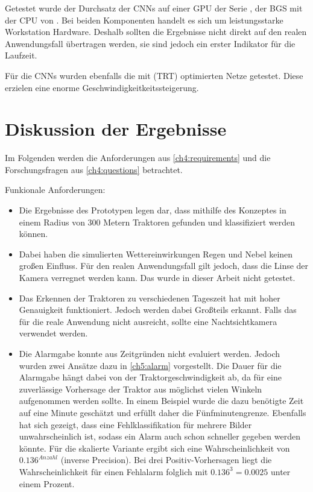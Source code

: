 Getestet wurde der Durchsatz der \acp{CNN} auf einer GPU der Serie , der \ac{BGS} mit der CPU  von .
Bei beiden Komponenten handelt es sich um leistungsstarke Workstation Hardware.
Deshalb sollten die Ergebnisse nicht direkt auf den realen Anwendungsfall übertragen werden, sie sind jedoch ein erster Indikator für die Laufzeit.

Für die \acp{CNN} wurden ebenfalls die mit  (TRT) optimierten Netze getestet.
Diese erzielen eine enorme Geschwindigkeitkeitssteigerung.

\section{Diskussion der Ergebnisse} \label{ch6:discussion}
Im Folgenden werden die Anforderungen aus \autoref{ch4:requirements} und die Forschungsfragen aus \autoref{ch4:questions} betrachtet.

\bigskip
Funkionale Anforderungen:
\begin{itemize}
    \item Die Ergebnisse des Prototypen legen dar, dass mithilfe des Konzeptes in einem Radius von 300 Metern Traktoren gefunden und klassifiziert werden können.

    \item Dabei haben die simulierten Wettereinwirkungen Regen und Nebel keinen großen Einfluss.
    Für den realen Anwendungsfall gilt jedoch, dass die Linse der Kamera verregnet werden kann. 
    Das wurde in dieser Arbeit nicht getestet.

    \item Das Erkennen der Traktoren zu verschiedenen Tageszeit hat mit hoher Genauigkeit funktioniert.
    Jedoch werden dabei Großteils  erkannt.
    Falls das für die reale Anwendung nicht ausreicht, sollte eine Nachtsichtkamera verwendet werden.

    \item Die Alarmgabe konnte aus Zeitgründen nicht evaluiert werden.
    Jedoch wurden zwei Ansätze dazu in \autoref{ch5:alarm} vorgestellt.
    Die Dauer für die Alarmgabe hängt dabei von der Traktorgeschwindigkeit ab, da für eine zuverlässige Vorhersage der Traktor aus möglichst vielen Winkeln aufgenommen werden sollte.
    In einem Beispiel wurde die dazu benötigte Zeit auf eine Minute geschätzt und erfüllt daher die Fünfminutengrenze.
    Ebenfalls hat sich gezeigt, dass eine Fehlklassifikation für mehrere Bilder unwahrscheinlich ist, sodass ein Alarm auch schon schneller gegeben werden könnte.
    Für die skalierte Variante ergibt sich eine Wahrscheinlichkeit von $0.136^{Anzahl}$ (inverse Precision).
    Bei drei Positiv-Vorhersagen liegt die Wahrscheinlichkeit für einen Fehlalarm folglich mit $0.136^3 = 0.0025$ unter einem Prozent.
\end{itemize}

